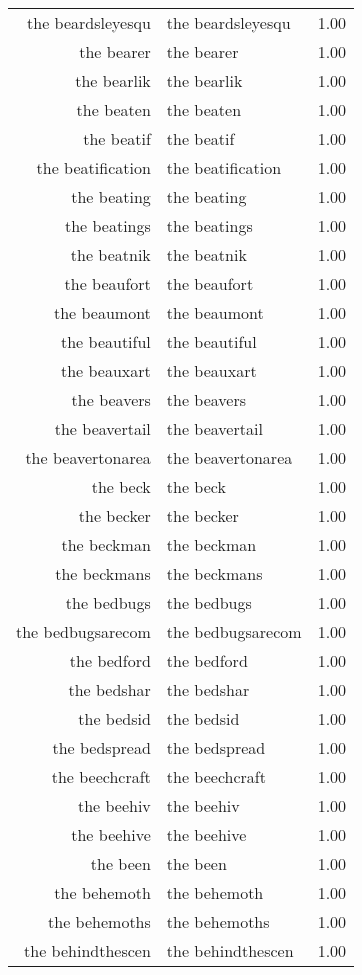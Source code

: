 \begin{table}[ht]
\begin{tabular}{rlr}
  the beardsleyesqu & the beardsleyesqu & 1.00 \\ 
  the bearer & the bearer & 1.00 \\ 
  the bearlik & the bearlik & 1.00 \\ 
  the beaten & the beaten & 1.00 \\ 
  the beatif & the beatif & 1.00 \\ 
  the beatification & the beatification & 1.00 \\ 
  the beating & the beating & 1.00 \\ 
  the beatings & the beatings & 1.00 \\ 
  the beatnik & the beatnik & 1.00 \\ 
  the beaufort & the beaufort & 1.00 \\ 
  the beaumont & the beaumont & 1.00 \\ 
  the beautiful & the beautiful & 1.00 \\ 
  the beauxart & the beauxart & 1.00 \\ 
  the beavers & the beavers & 1.00 \\ 
  the beavertail & the beavertail & 1.00 \\ 
  the beavertonarea & the beavertonarea & 1.00 \\ 
  the beck & the beck & 1.00 \\ 
  the becker & the becker & 1.00 \\ 
  the beckman & the beckman & 1.00 \\ 
  the beckmans & the beckmans & 1.00 \\ 
  the bedbugs & the bedbugs & 1.00 \\ 
  the bedbugsarecom & the bedbugsarecom & 1.00 \\ 
  the bedford & the bedford & 1.00 \\ 
  the bedshar & the bedshar & 1.00 \\ 
  the bedsid & the bedsid & 1.00 \\ 
  the bedspread & the bedspread & 1.00 \\ 
  the beechcraft & the beechcraft & 1.00 \\ 
  the beehiv & the beehiv & 1.00 \\ 
  the beehive & the beehive & 1.00 \\ 
  the been & the been & 1.00 \\ 
  the behemoth & the behemoth & 1.00 \\ 
  the behemoths & the behemoths & 1.00 \\ 
  the behindthescen & the behindthescen & 1.00 \\ 

\end{tabular}
\end{table}

